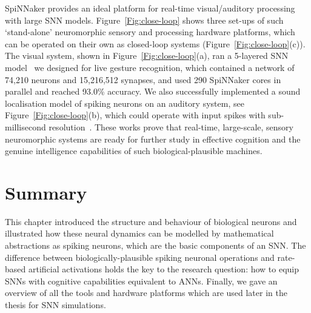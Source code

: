 SpiNNaker provides an ideal platform for real-time visual/auditory processing with large SNN models.
Figure~\ref{Fig:close-loop} shows three set-ups of such `stand-alone' neuromorphic sensory and processing hardware platforms, which can be operated on their own as closed-loop systems (Figure~\ref{Fig:close-loop}(c)).
The visual system, shown in Figure~\ref{Fig:close-loop}(a), ran a 5-layered SNN model~\citep{liu2014real} we designed for live gesture recognition, which contained a network of 74,210 neurons and 15,216,512 synapses, and used 290 SpiNNaker cores in parallel and reached 93.0\% accuracy.
We also successfully implemented a sound localisation model of spiking neurons on an auditory system, see Figure~\ref{Fig:close-loop}(b), which could operate with input spikes with sub-millisecond resolution~\citep{lagorce2015breaking}.
These works prove that real-time, large-scale, sensory neuromorphic systems are ready for further study in effective cognition and the genuine intelligence capabilities of such biological-plausible machines.

\section{Summary}
This chapter introduced the structure and behaviour of biological neurons and illustrated how these neural dynamics can be modelled by mathematical abstractions as spiking neurons, which are the basic components of an SNN.
The difference between biologically-plausible spiking neuronal operations and rate-based artificial activations holds the key to the research question: how to equip SNNs with cognitive capabilities equivalent to ANNs.
Finally, we gave an overview of all the tools and hardware platforms which are used later in the thesis for SNN simulations.
